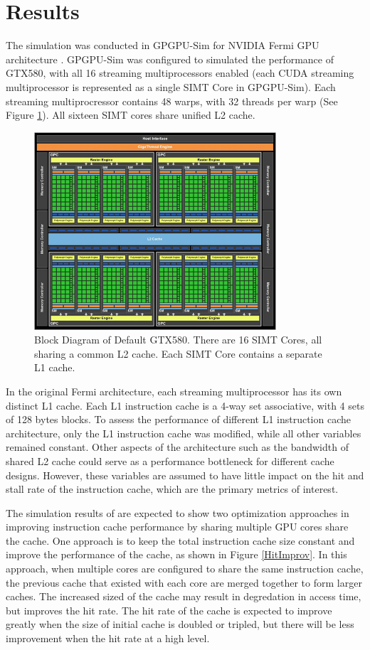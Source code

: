 \section{Results}

The simulation was conducted in GPGPU-Sim for NVIDIA Fermi GPU architecture \cite{bakhodayuan09}. GPGPU-Sim was configured to simulated the performance of GTX580, with all 16 streaming multiprocessors enabled (each CUDA streaming multiprocessor is represented as a single SIMT Core in GPGPU-Sim). Each streaming multiprocressor contains 48 warps, with 32 threads per warp (See Figure \ref{GTX580}). All sixteen SIMT cores share unified L2 cache.

\begin{figure}[ht!]
\centering
\label{GTX580}
\includegraphics[width=90mm]{GTX580.jpg}
\caption{Block Diagram of Default GTX580. There are 16 SIMT Cores, all sharing a common L2 cache. Each SIMT Core contains a separate L1 cache.}
\end{figure}

In the original Fermi architecture, each streaming multiprocessor has its own distinct L1 cache. Each L1 instruction cache is a 4-way set associative, with 4 sets of 128 bytes blocks. To assess the  performance of different L1 instruction cache architecture, only the L1 instruction cache was modified, while all other variables remained constant. Other aspects of the architecture such as the bandwidth of shared L2 cache could serve as a performance bottleneck for different cache designs. However, these variables are assumed to have little impact on the hit and stall rate of the instruction cache, which are the primary metrics of interest.

The simulation results of are expected to show two optimization approaches in improving instruction cache performance by sharing multiple GPU cores share the cache. One approach is to keep the total instruction cache size constant and improve the performance of the cache, as shown in Figure \ref{HitImprov}. In this approach, when multiple cores are configured to share the same instruction cache, the previous cache that existed with each core are merged together to form larger caches. The increased sized of the cache may result in degredation in access time, but improves the hit rate. The hit rate of the cache is expected to improve greatly when the size of initial cache is doubled or tripled, but there will be less improvement when the hit rate at a high level.

